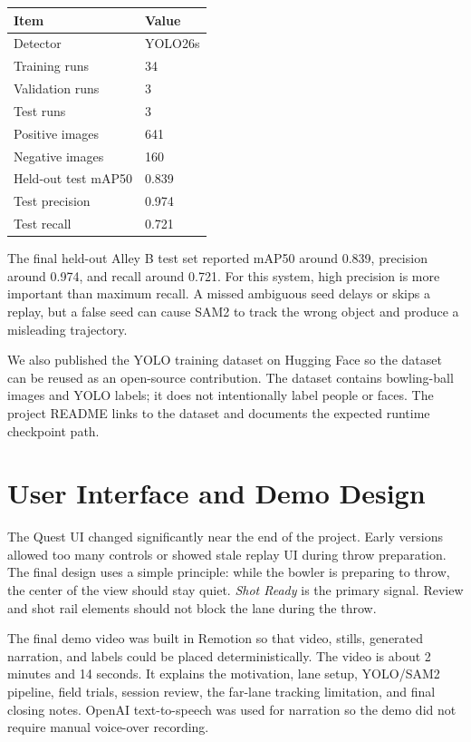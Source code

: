\documentclass[11pt]{article}
\begin{document}
\begin{center}
  \begin{tabular}{@{}ll@{}}
    \toprule
    Item & Value \\
    \midrule
    Detector & YOLO26s \\
    Training runs & 34 \\
    Validation runs & 3 \\
    Test runs & 3 \\
    Positive images & 641 \\
    Negative images & 160 \\
    Held-out test mAP50 & 0.839 \\
    Test precision & 0.974 \\
    Test recall & 0.721 \\
    \bottomrule
  \end{tabular}
\end{center}

The final held-out Alley B test set reported mAP50 around 0.839, precision around 0.974, and recall around 0.721. For this system, high precision is more important than maximum recall. A missed ambiguous seed delays or skips a replay, but a false seed can cause SAM2 to track the wrong object and produce a misleading trajectory.

We also published the YOLO training dataset on Hugging Face so the dataset can be reused as an open-source contribution. The dataset contains bowling-ball images and YOLO labels; it does not intentionally label people or faces. The project README links to the dataset and documents the expected runtime checkpoint path.

\section{User Interface and Demo Design}

The Quest UI changed significantly near the end of the project. Early versions allowed too many controls or showed stale replay UI during throw preparation. The final design uses a simple principle: while the bowler is preparing to throw, the center of the view should stay quiet. \emph{Shot Ready} is the primary signal. Review and shot rail elements should not block the lane during the throw.

The final demo video was built in Remotion so that video, stills, generated narration, and labels could be placed deterministically. The video is about 2 minutes and 14 seconds. It explains the motivation, lane setup, YOLO/SAM2 pipeline, field trials, session review, the far-lane tracking limitation, and final closing notes. OpenAI text-to-speech was used for narration so the demo did not require manual voice-over recording.
\end{document}
